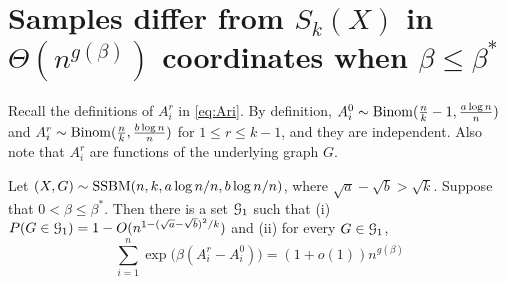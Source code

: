 \documentclass{article}
\begin{document}
\section{Samples differ from $S_k(X)$ in $\Theta(n^{g(\beta)})$ coordinates when $\beta\le\beta^\ast$}  \label{sect:struct}
Recall the definitions of $A^r_i$ in \eqref{eq:Ari}.
By definition,
$A^0_i\sim \operatorname{Binom}(\frac{n}{k}-1,\frac{a\log n}{n})$ and $A^r_i\sim \operatorname{Binom}(\frac{n}{k}, \frac{b\log n}{n})$ for $1\leq r \leq k-1$,
and they are independent.
Also note that $A^r_i$ are functions of the underlying graph $G$.

\begin{proposition}  \label{prop:con}
Let $(X,G)\sim \operatorname{SSBM}(n,k, a\log n/n, b\log n/n)$, where $\sqrt{a}-\sqrt{b} > \sqrt{k}$.
Suppose that $0< \beta \le \beta^\ast$.
Then there is a set $\mathcal{G}_{1}$ such that (i) $P(G \in \mathcal{G}_{1}) = 1-O(n^{1-(\sqrt{a}-\sqrt{b})^2/k})$ and (ii) for every $G\in \mathcal{G}_{1}$, 
$$
\sum_{i=1}^n \exp\big(\beta (A^r_i-A^0_i) \big)
=(1+o(1)) n^{g(\beta)}
$$
\end{proposition}
\end{document}

